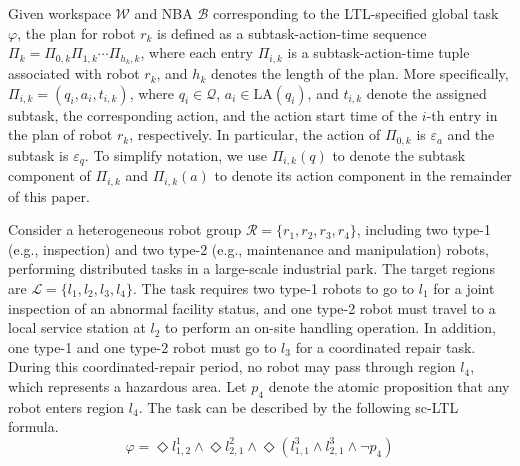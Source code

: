 \documentclass[lettersize,journal]{IEEEtran}
\begin{document}
Given workspace $\mathcal{W}$ and NBA $\mathcal{B}$ corresponding to the LTL-specified global task $\varphi$, the plan for robot $r_k$ is defined as a subtask-action-time sequence $\Pi_k = \Pi_{0,k}\Pi_{1,k}\cdots \Pi_{h_k,k}$, where each entry $\Pi_{i,k}$ is a subtask-action-time tuple associated with robot $r_k$, and $h_k$ denotes the length of the plan. More specifically, $\Pi_{i,k} = (q_i, a_i, t_{i,k})$, where $q_i \in \mathcal{Q}$, $a_i \in \mathrm{LA}(q_i)$, and $t_{i,k}$ denote the assigned subtask, the corresponding action, and the action start time of the $i$-th entry in the plan of robot $r_k$, respectively. In particular, the action of $\Pi_{0,k}$ is $\varepsilon_a$ and the subtask is $\varepsilon_q$. To  simplify notation, we use $\Pi_{i,k}(q)$ to denote the subtask component of $\Pi_{i,k}$ and $\Pi_{i,k}(a)$ to denote its action component in the remainder of this paper.


\begin{example} \label{example1}
Consider a heterogeneous robot group $\mathcal{R} = \{r_1, r_2, r_3, r_4\}$, including two type-1 (e.g., inspection) and two type-2 (e.g., maintenance and manipulation) robots, performing distributed tasks in a large-scale industrial park. The target regions are $\mathcal{L} = \{l_1, l_2, l_3, l_4\}$. The task requires two type-1 robots to go to $l_1$ for a joint inspection of an abnormal facility status, and one type-2 robot must travel to a local service station at $l_2$ to perform an on-site handling operation. In addition, one type-1 and one type-2 robot must go to $l_3$ for a coordinated repair task. During this coordinated-repair period, no robot may pass through region $l_4$, which represents a hazardous area. Let $p_4$ denote the atomic proposition that any robot enters region $l_4$. The task can be described by the following sc-LTL formula.
\begin{equation} \label{eq:example_task}
\varphi = \Diamond l_{1,2}^1 \land \Diamond l_{2,1}^2 \land \Diamond (l_{1,1}^3 \land l_{2,1}^3 \land \neg p_{4})
\end{equation}
 \end{example}
\end{document}
